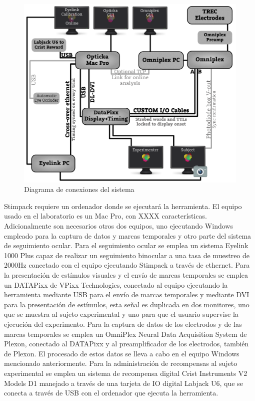 \documentclass[conference]{IEEEtran}
\begin{document}
\begin{figure}[htbp]
\centerline{\includegraphics[width=\linewidth]{figures/system_diagram.png}}
\caption{Diagrama de conexiones del sistema}
\label{figSysDiagram}
\end{figure}

Stimpack requiere un ordenador donde se ejecutará la herramienta. El equipo usado en el laboratorio es un Mac Pro, con XXXX características.
Adicionalmente son necesarios otros dos equipos, uno ejecutando Windows empleado para la captura de datos y marcas temporales y otro parte del sistema de seguimiento ocular.
Para el seguimiento ocular se emplea un sistema Eyelink 1000 Plus\cite{eyelink} capaz de realizar un seguimiento binocular a una tasa de muestreo de 2000Hz conectado con el equipo ejecutando Stimpack a través de ethernet.
Para la presentación de estímulos visuales y el envío de marcas temporales se emplea un DATAPixx \cite{datapixx} de VPixx Technologies, conectado al equipo ejecutando la herramienta mediante USB para el envío de marcas temporales y mediante DVI para la presentación de estímulos, esta señal es duplicada en dos monitores, uno que se muestra al sujeto experimental y uno para que el usuario supervise la ejecución del experimento.
Para la captura de datos de los electrodos y de las marcas temporales se emplea un OmniPlex Neural Data Acquisition System\cite{omniplex} de Plexon, conectado al DATAPixx y al preamplificador de los electrodos, también de Plexon. El procesado de estos datos se lleva a cabo en el equipo Windows mencionado anteriormente.
Para la administración de recompensas al sujeto experimental se emplea un sistema de recompensa digital Crist Instruments V2 Models D1 manejado a través de una  tarjeta de IO digital Labjack U6\cite{labjack}, que se conecta a través de USB con el ordenador que ejecuta la herramienta.
\end{document}
